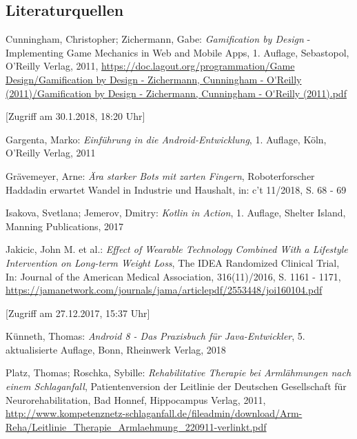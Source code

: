 \renewcommand{\refname}{Literatur- und Quellenverzeichnis}

\begin{thebibliography}{xxxxxx}

\subsection*{Literaturquellen}

 Cunningham, Christopher; Zichermann, Gabe: \textit{Gamification by Design} - Implementing Game Mechanics in Web and Mobile Apps, 1. Auflage, Sebastopol, O'Reilly Verlag, 2011, \url{https://doc.lagout.org/programmation/Game Design/Gamification by Design - Zichermann, Cunningham - O'Reilly (2011)/Gamification by Design - Zichermann, Cunningham - O'Reilly (2011).pdf}

[Zugriff am 30.1.2018, 18:20 Uhr]

 Gargenta, Marko: \textit{Einführung in die Android-Entwicklung}, 1. Auflage, Köln, O'Reilly Verlag, 2011

 Grävemeyer, Arne: \textit{Ära starker Bots mit zarten Fingern}, Roboterforscher Haddadin erwartet Wandel in Industrie und Haushalt, in: c't 11/2018, S. 68 - 69

 Isakova, Svetlana; Jemerov, Dmitry: \textit{Kotlin in Action}, 1. Auflage, Shelter Island, Manning Publications, 2017

 Jakicic, John M. et al.: \textit{Effect of Wearable Technology Combined With a Lifestyle Intervention on Long-term Weight Loss}, The IDEA Randomized Clinical Trial, In: Journal of the American Medical Association, 316(11)/2016, S. 1161 - 1171, \url{https://jamanetwork.com/journals/jama/articlepdf/2553448/joi160104.pdf}

[Zugriff am 27.12.2017, 15:37 Uhr]

 Künneth, Thomas: \textit{Android 8 - Das Praxisbuch für Java-Entwickler}, 5. aktualisierte Auflage, Bonn, Rheinwerk Verlag, 2018

 Platz, Thomas; Roschka, Sybille: \textit{Rehabilitative Therapie bei Armlähmungen nach einem Schlaganfall}, Patientenversion der Leitlinie der Deutschen Gesellschaft für Neurorehabilitation, Bad Honnef, Hippocampus Verlag, 2011, 
\url{http://www.kompetenznetz-schlaganfall.de/fileadmin/download/Arm-Reha/Leitlinie_Therapie_Armlaehmung_220911-verlinkt.pdf} 


\end{thebibliography}
